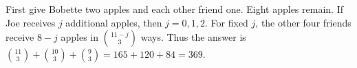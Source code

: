First give Bobette two apples and each other friend one. Eight apples remain. If Joe receives $j$ additional apples, then $j=0,1,2$. For fixed $j$, the other four friends receive $8-j$ apples in $\binom{11-j}{3}$ ways. Thus the answer is $\binom{11}{3}+\binom{10}{3}+\binom{9}{3}=165+120+84=\boxed{369}$.
